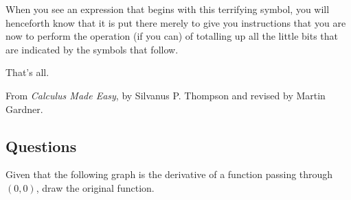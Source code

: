 When you see an expression that begins with this terrifying symbol, you will henceforth know that it is put
there merely to give you instructions that you are now to perform the operation (if you can) of totalling up
all the little bits that are indicated by the symbols that follow.

That's all.

\begin{flushright}
  From \textit{Calculus Made Easy}, by Silvanus P. Thompson and revised by Martin Gardner.
\end{flushright}

\clearpage
\subsection*{Questions}
\begin{questions}
  \question Given that the following graph is the derivative of a function passing through $ (0,0) $, draw the original function.
      \begin{center}
      \end{center}
  \question
\end{questions}

